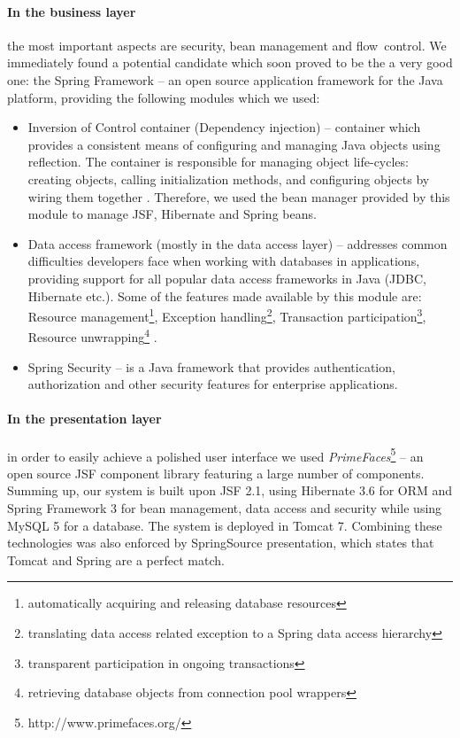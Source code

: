 \paragraph{In the business layer} the most important aspects are security, bean management and flow~control. We immediately found a potential candidate which soon proved to be the a very good one: the Spring Framework -- an open source application framework for the Java platform, providing the following modules which we used:
\begin{itemize}
  \item Inversion of Control container (Dependency injection) -- container which provides a consistent means of configuring and managing Java objects using reflection. The container is responsible for managing object life-cycles: creating objects, calling initialization methods, and configuring objects by wiring them together \cite{wiki_spring}. Therefore, we used the bean manager provided by this module to manage JSF, Hibernate and Spring beans.
  \item Data access framework (mostly in the data access layer) -- addresses common difficulties developers face when working with databases in applications, providing support for all popular data access frameworks in Java (JDBC, Hibernate etc.). Some of the  features made available by this module are: Resource management\footnote{automatically acquiring and releasing database resources}, Exception handling\footnote{translating data access related exception to a Spring data access hierarchy}, Transaction  participation\footnote{transparent participation in ongoing transactions}, Resource unwrapping\footnote{retrieving database objects from connection pool wrappers} \cite{wiki_spring}.
  \item Spring Security -- is a Java framework that provides authentication, authorization and other security features for enterprise applications.
\end{itemize}

\paragraph{In the presentation layer} in order to easily achieve a polished user interface we used \emph{PrimeFaces}\footnote{http://www.primefaces.org/} -- an open source JSF component library featuring a large number of components.
\\

\noindent Summing up, our system is built upon JSF 2.1, using Hibernate 3.6 for ORM and Spring Framework 3 for bean management, data access and security while using MySQL 5 for a database. The system is deployed in Tomcat 7. Combining these technologies was also enforced by SpringSource presentation\cite{tomcat_spring}, which states that Tomcat and Spring are a perfect match.
\\


